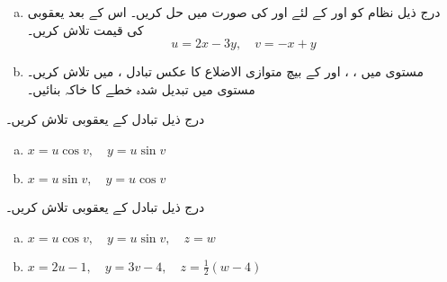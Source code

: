 \begin{enumerate}[a.]
\item
درج ذیل نظام کو  اور  کے لئے  اور  کی صورت میں حل کریں۔ اس کے بعد یعقوبی  کی قیمت تلاش کریں۔
\[u=2x-3y,\quad v=-x+y\]
\item
مستوی  میں    ،   ،  اور    کے بیچ   متوازی  الاضلاع کا عکس تبادل ،  میں تلاش کریں۔ مستوی  میں تبدیل شدہ  خطے کا خاکہ بنائیں۔
\end{enumerate}
درج ذیل تبادل کے یعقوبی تلاش کریں۔
\begin{multicols}{2}
\begin{enumerate}[a.]
\item
\(x=u\cos v,\quad y=u\sin v\)
\item
\(x=u\sin v,\quad y=u\cos v\)
\end{enumerate}
\end{multicols}
درج ذیل تبادل کے یعقوبی تلاش کریں۔
\begin{enumerate}[a.]
\item
\(x=u\cos v,\quad y=u\sin v,\quad z=w\)
\item
\(x=2u-1,\quad y=3v-4,\quad z=\frac{1}{2}(w-4)\)
\end{enumerate}

